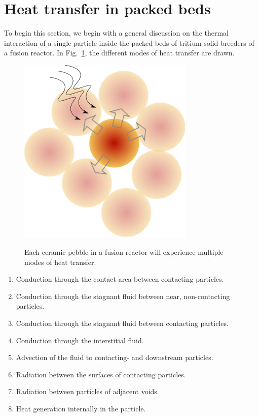 \section{Heat transfer in packed beds} \label{sec:modeling-heat-transfer}
To begin this section, we begin with a general discussion on the thermal interaction of a single particle inside the packed beds of tritium solid breeders of a fusion reactor. In Fig.~\ref{fig:peb-comp-ht}, the different modes of heat transfer are drawn.

\begin{figure}[t]
	\centering
	\caption{Each ceramic pebble in a fusion reactor will experience multiple modes of heat transfer.}
	\includegraphics[width=0.75\textwidth]{chapters/figures/pebble-complete-heat-transfer}\label{fig:peb-comp-ht}
\end{figure}



\begin{enumerate}
\item Conduction through the contact area between contacting particles.
\item Conduction through the stagnant fluid between near, non-contacting particles.
\item Conduction through the stagnant fluid between contacting particles.
\item Conduction through the interstitial fluid. 
\item Advection of the fluid to contacting- and downstream particles.
\item Radiation between the surfaces of contacting particles.
\item Radiation between particles of adjacent voids.
\item Heat generation internally in the particle.
\end{enumerate}

